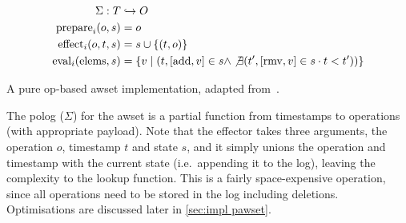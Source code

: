 \begin{listing}[htp]
  \begin{align*}
    \Sigma: T&\hookrightarrow O \\
    \mathrm{prepare}_i(o, s) &= o \\
    \mathrm{effect}_i(o, t, s) &= s \cup \{(t, o)\} \\
    \mathrm{eval}_i(\mathrm{elems}, s) &= \{v \mid (t, [\mathrm{add}, v]\in s \land 
    \not\exists (t', [\mathrm{rmv}, v]\in s\cdot t < t'))\}
  \end{align*}
  \caption{A pure op-based \acrshort{awset} implementation, adapted 
  from~\cite{baquero2017PureOp}.}
  \label{lst:pure op-based awset}
\end{listing}


The \acrshort{polog} (\(\Sigma\)) for the \acrshort{awset} is a partial function from 
timestamps to operations (with appropriate payload).
Note that the effector takes three arguments,
the operation \(o\), timestamp \(t\) and state \(s\), and it simply unions
the operation and timestamp with the current state (i.e.\ appending it to the log), 
leaving the complexity
to the lookup function. This is a fairly space-expensive operation, since all operations
need to be stored in the log including deletions. Optimisations are discussed
later in \cref{sec:impl pawset}.

